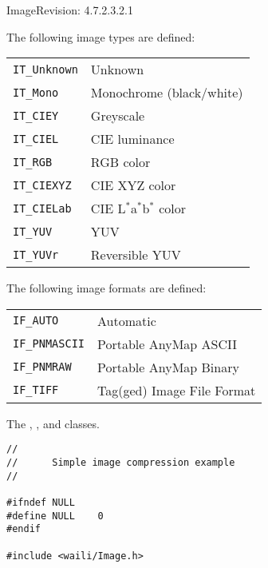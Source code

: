 \begin{manpage}{\libtitle}{Image}{$ $Revision: 4.7.2.3.2.1 $ $}
\subtitle{Image Types \\ and Formats}
    The following image types are defined:
    \begin{center}\begin{tabular}{|l|l|}
    \hline
    \texttt{IT\_Unknown} & Unknown \\
    \texttt{IT\_Mono}    & Monochrome (black/white) \\
    \texttt{IT\_CIEY}    & Greyscale \\
    \texttt{IT\_CIEL}    & CIE luminance \\
    \texttt{IT\_RGB}     & RGB color \\
    \texttt{IT\_CIEXYZ}  & CIE XYZ color \\
    \texttt{IT\_CIELab}  & CIE L$^*$a$^*$b$^*$ color \\
    \texttt{IT\_YUV}     & YUV \\
    \texttt{IT\_YUVr}    & Reversible YUV \\
    \hline
    \end{tabular}\end{center}

    The following image formats are defined:
    \begin{center}\begin{tabular}{|l|l|}
    \hline
    \texttt{IF\_AUTO}     & Automatic \\
    \texttt{IF\_PNMASCII} & Portable AnyMap ASCII \\
    \texttt{IF\_PNMRAW}   & Portable AnyMap Binary \\
    \texttt{IF\_TIFF}     & Tag(ged) Image File Format \\
    \hline
    \end{tabular}\end{center}


\subtitle{See Also}
    The , ,  and 
    classes.


\subtitle{Example}

\begin{verbatim}
//
//      Simple image compression example
//

#ifndef NULL
#define NULL    0
#endif

#include <waili/Image.h>


\end{verbatim}
\end{manpage}
